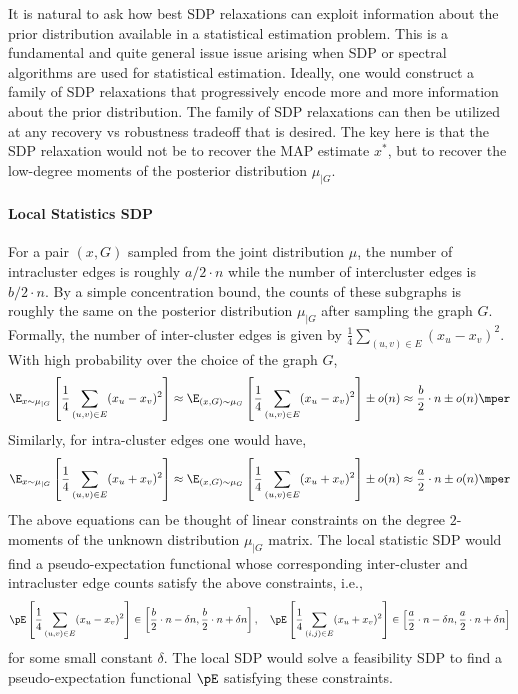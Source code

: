 It is natural to ask how best SDP relaxations can exploit information about the prior distribution available in a statistical estimation problem.
%
This is a fundamental and quite general issue issue arising when SDP or spectral algorithms are used for statistical estimation.
%
Ideally, one would construct a family of SDP relaxations that progressively encode more and more information about the prior distribution.
%
The family of SDP relaxations can then be utilized at any recovery vs robustness tradeoff that is desired.
%
%
The key here is that the SDP relaxation would not be to recover the MAP estimate $x^*$, but to recover the low-degree moments of the posterior distribution $\mu_{|G}$.
%
\paragraph{Local Statistics SDP}

For a pair $(x,G)$ sampled from the joint distribution $\mu$, the number of intracluster edges is roughly $a/2 \cdot n$ while the number of intercluster edges is $b/2 \cdot n$.
%
By a simple concentration bound, the counts of these subgraphs is roughly the same on the posterior distribution $\mu_{|G}$ after sampling the graph $G$.  
%
Formally, the number of inter-cluster edges is given by $\frac{1}{4}\sum_{(u,v)\in E} (x_u - x_v)^2$.  
%
With high probability over the choice of the graph $G$,
%
\[  \E_{x \sim \mu_{|G}} \left[ \frac{1}{4}\sum_{(u,v)\in E} (x_u - x_v)^2 \right] \approx \E_{(x,G) \sim \mu_G}\left[\frac{1}{4}\sum_{(u,v)\in E} (x_u - x_v)^2\right] \pm o(n) \approx \frac{b}{2} \cdot n \pm o(n) \mper \] 
Similarly, for intra-cluster edges one would have,
\[  \E_{x \sim \mu_{|G}} \left[ \frac{1}{4}\sum_{(u,v)\in E} (x_u + x_v)^2 \right] \approx \E_{(x,G) \sim \mu_G}\left[\frac{1}{4}\sum_{(u,v)\in E} (x_u + x_v)^2\right] \pm o(n) \approx \frac{a}{2} \cdot n \pm o(n) \mper \] 
%
The above equations can be thought of linear constraints on the degree $2$-moments of the unknown distribution $\mu_{|G}$ matrix.  The local statistic SDP would find a pseudo-expectation functional whose corresponding inter-cluster and intracluster edge counts satisfy the above constraints, i.e.,
$$ \pE \left[ \frac{1}{4}\sum_{(u,v)\in E} (x_u - x_v)^2 \right] \in  \left[\frac{b}{2} \cdot n - \delta n, \frac{b}{2} \cdot n + \delta n\right] , \quad
 \pE \left[ \frac{1}{4}\sum_{(i,j)\in E} (x_u + x_v)^2 \right] \in  \left[\frac{a}{2} \cdot n - \delta n, \frac{a}{2} \cdot n + \delta n\right] $$
for some small constant $\delta$.  The local SDP would solve a feasibility SDP to find a pseudo-expectation functional $\pE$ satisfying these constraints.
%


